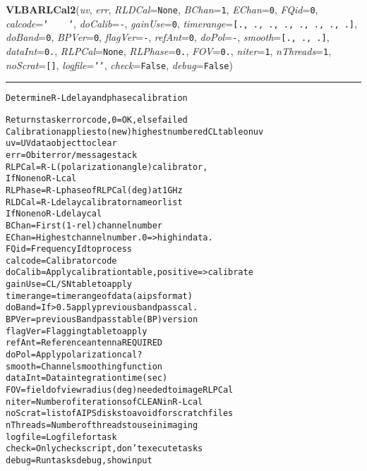     \label{VLBACal:VLBARLCal2}
    \vspace{0.5ex}

    \begin{boxedminipage}{\textwidth}

    \raggedright \textbf{VLBARLCal2}(\textit{uv}, \textit{err}, \textit{RLDCal}=\texttt{N\-o\-n\-e\-}, \textit{BChan}=\texttt{1\-}, \textit{EChan}=\texttt{0\-}, \textit{FQid}=\texttt{0\-}, \textit{calcode}=\texttt{'\-~\-~\-~\-~\-'\-}, \textit{doCalib}=\texttt{-\-}, \textit{gainUse}=\texttt{0\-}, \textit{timerange}=\texttt{[\-.\-,\-~\-.\-,\-~\-.\-,\-~\-.\-,\-~\-.\-,\-~\-.\-,\-~\-.\-,\-~\-.\-]\-}, \textit{doBand}=\texttt{0\-}, \textit{BPVer}=\texttt{0\-}, \textit{flagVer}=\texttt{-\-}, \textit{refAnt}=\texttt{0\-}, \textit{doPol}=\texttt{-\-}, \textit{smooth}=\texttt{[\-.\-,\-~\-.\-,\-~\-.\-]\-}, \textit{dataInt}=\texttt{0\-.\-}, \textit{RLPCal}=\texttt{N\-o\-n\-e\-}, \textit{RLPhase}=\texttt{0\-.\-}, \textit{FOV}=\texttt{0\-.\-}, \textit{niter}=\texttt{1\-}, \textit{nThreads}=\texttt{1\-}, \textit{noScrat}=\texttt{[\-]\-}, \textit{logfile}=\texttt{'\-'\-}, \textit{check}=\texttt{F\-a\-l\-s\-e\-}, \textit{debug}=\texttt{F\-a\-l\-s\-e\-})

    \vspace{-1.5ex}

    \rule{\textwidth}{0.5\fboxrule}
\begin{alltt}
Determine R-L delay and phase calibration

Returns task error code, 0=OK, else failed
Calibration applies to (new) highest numbered CL table on uv
uv       = UV data object to clear
err      = Obit error/message stack
RLPCal   = R-L (polarization angle) calibrator,
           If None no R-L cal
RLPhase  = R-L phase of RLPCal (deg) at 1 GHz
RLDCal   = R-L delay calibrator name or list
           If None no R-L delay cal
BChan    = First (1-rel) channel number
EChan    = Highest channel number. 0={\textgreater} high in data.
FQid     = Frequency Id to process
calcode  = Calibrator code
doCalib  = Apply calibration table, positive={\textgreater}calibrate
gainUse  = CL/SN table to apply
timerange= time range of data (aips format)
doBand   = If {\textgreater}0.5 apply previous bandpass cal.
BPVer    = previous Bandpass table (BP) version
flagVer  = Flagging table to apply
refAnt   = Reference antenna REQUIRED
doPol    = Apply polarization cal?
smooth   = Channel smoothing function
dataInt  = Data integration time (sec)
FOV      = field of view radius (deg) needed to image RLPCal
niter    = Number  of iterations of CLEAN in R-L cal
noScrat  = list of AIPS disks to avoid for scratch files
nThreads = Number of threads to use in imaging
logfile  = Log file for task
check    = Only check script, don't execute tasks
debug    = Run tasks debug, show input\end{alltt}

    \vspace{1ex}

    \end{boxedminipage}

